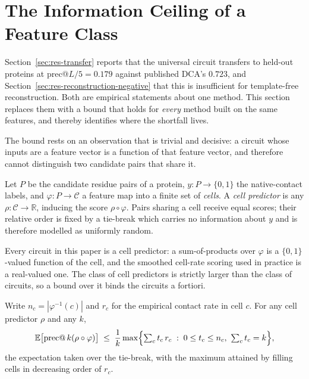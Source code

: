 \section{The Information Ceiling of a Feature Class}
\label{sec:res-ceiling}

Section~\ref{sec:res-transfer} reports that the universal circuit transfers to
held-out proteins at prec@$L/5 = 0.179$ against published DCA's $0.723$, and
Section~\ref{sec:res-reconstruction-negative} that this is insufficient for
template-free reconstruction.  Both are empirical statements about one method.
This section replaces them with a bound that holds for \emph{every} method
built on the same features, and thereby identifies where the shortfall lives.

The bound rests on an observation that is trivial and decisive: a circuit whose
inputs are a feature vector is a function of that feature vector, and therefore
cannot distinguish two candidate pairs that share it.

\begin{definition}
\label{def:cellpredictor}
Let $P$ be the candidate residue pairs of a protein, $y : P \to \{0,1\}$ the
native-contact labels, and $\varphi : P \to \mathcal{C}$ a feature map into a
finite set of \emph{cells}.  A \emph{cell predictor} is any
$\rho : \mathcal{C} \to \mathbb{R}$, inducing the score $\rho \circ \varphi$.
Pairs sharing a cell receive equal scores; their relative order is fixed by a
tie-break which carries no information about $y$ and is therefore modelled as
uniformly random.
\end{definition}

Every circuit in this paper is a cell predictor: a sum-of-products over
$\varphi$ is a $\{0,1\}$-valued function of the cell, and the smoothed
cell-rate scoring used in practice is a real-valued one.  The class of cell
predictors is strictly larger than the class of circuits, so a bound over it
binds the circuits a fortiori.

\begin{theorem}[Ceiling]
\label{thm:ceiling}
Write $n_c = |\varphi^{-1}(c)|$ and $r_c$ for the empirical contact rate in
cell $c$.  For any cell predictor $\rho$ and any $k$,
\[
\mathbb{E}\bigl[\operatorname{prec@}k(\rho \circ \varphi)\bigr]
\;\leq\; \frac{1}{k}\max\Bigl\{ \textstyle\sum_{c} t_c\, r_c \;:\;
0 \le t_c \le n_c,\ \sum_c t_c = k \Bigr\},
\]
the expectation taken over the tie-break, with the maximum attained by filling
cells in decreasing order of $r_c$.
\end{theorem}

